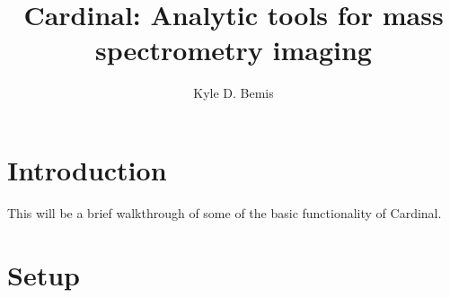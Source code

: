 \documentclass[a4paper]{article}
\title{Cardinal: Analytic tools for mass spectrometry imaging}
\author{Kyle D. Bemis}
\begin{document}


\maketitle

\tableofcontents

\section{Introduction}

This will be a brief walkthrough of some of the basic functionality of Cardinal.

\section{Setup}
\end{document}
